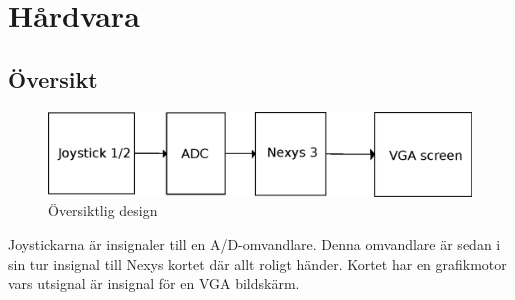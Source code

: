 \section{Hårdvara}
\subsection{Översikt}
	\begin{center}
		\begin{figure}[H]
    	\centering
			\includegraphics[scale=0.70]{../grafik/overview.eps}
			\caption{Översiktlig design}
			\label{fig:over}
		\end{figure}
	\end{center}
Joystickarna är insignaler till en A/D-omvandlare. Denna omvandlare är sedan i sin tur insignal till Nexys kortet där allt roligt händer. Kortet har en grafikmotor vars utsignal är insignal för en VGA bildskärm. 
